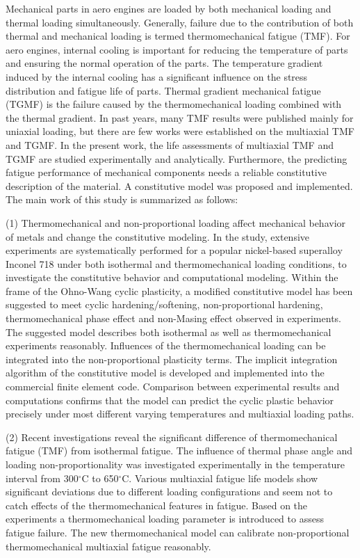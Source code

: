 \noindent
Mechanical parts in aero engines are loaded by both mechanical loading and thermal loading simultaneously. Generally, failure due to the contribution of both thermal and mechanical loading is termed thermomechanical fatigue (TMF). For aero engines, internal cooling is important for reducing the temperature of parts and ensuring the normal operation of the parts. The temperature gradient induced by the internal cooling has a significant influence on the stress distribution and fatigue life of parts. Thermal gradient mechanical fatigue (TGMF) is the failure caused by the thermomechanical loading combined with the thermal gradient. In past years, many TMF results were published mainly for uniaxial loading, but there are few works were established on the multiaxial TMF and TGMF. In the present work, the life assessments of multiaxial TMF and TGMF are studied experimentally and analytically. Furthermore, the predicting fatigue performance of mechanical components needs a reliable constitutive description of the material. A constitutive model was proposed and implemented. The main work of this study is summarized as follows:

(1) Thermomechanical and non-proportional loading affect mechanical behavior of metals and change the constitutive modeling. In the study, extensive experiments are systematically performed for a popular nickel-based superalloy Inconel 718 under both isothermal and thermomechanical loading conditions, to investigate the constitutive behavior and computational modeling. Within the frame of the Ohno-Wang cyclic plasticity, a modified constitutive model has been suggested to meet cyclic hardening/softening, non-proportional hardening, thermomechanical phase effect and non-Masing effect observed in experiments. The suggested model describes both isothermal as well as thermomechanical experiments reasonably. Influences of the thermomechanical loading can be integrated into the non-proportional plasticity terms. The implicit integration algorithm of the constitutive model is developed and implemented into the commercial finite element code. Comparison between experimental results and computations confirms that the model can predict the cyclic plastic behavior precisely under most different varying temperatures and multiaxial loading paths.

(2) Recent investigations reveal the significant difference of thermomechanical fatigue (TMF) from isothermal fatigue. The influence of thermal phase angle and loading non-proportionality was investigated experimentally in the temperature interval from 300$^\circ$C to 650$^\circ$C. Various multiaxial fatigue life models show significant deviations due to different loading configurations and seem not to catch effects of the thermomechanical features in fatigue. Based on the experiments a thermomechanical loading parameter is introduced to assess fatigue failure. The new thermomechanical model can calibrate non-proportional thermomechanical multiaxial fatigue reasonably.

